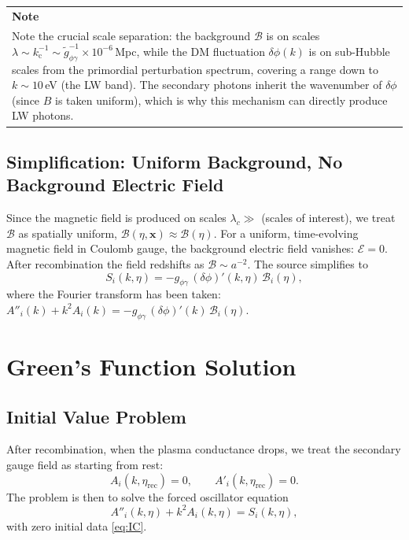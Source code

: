 \documentclass[12pt,a4paper]{report}
\newenvironment{notebox}[1][Note]{%
  \par\medskip\noindent
  \begin{tabular}{|p{\dimexpr\linewidth-2\tabcolsep-2\arrayrulewidth\relax}|}
  \hline
  \textbf{#1}\\[2pt]
}{%
  \\ \hline
  \end{tabular}
  \par\medskip
}
\newcommand{\kc}{k_{\mathrm{c}}}
\newcommand{\gag}{g_{\phi\gamma}}
\newcommand{\gtag}{\tilde{g}_{\phi\gamma}}
\renewcommand{\vec}[1]{\boldsymbol{#1}}
\theoremstyle{definition}
\begin{document}
\begin{notebox}
Note the crucial scale separation: the background $\mathcal{B}$ is on scales
$\lambda\sim\kc^{-1}\sim\gtag^{-1}\times 10^{-6}$\,Mpc, while the DM fluctuation
$\delta\phi(k)$ is on sub-Hubble scales from the primordial perturbation spectrum,
covering a range down to $k\sim 10$\,eV (the LW band). The secondary photons inherit
the wavenumber of $\delta\phi$ (since $B$ is taken uniform), which is why this
mechanism can directly produce LW photons.
\end{notebox}

\section{Simplification: Uniform Background, No Background Electric Field}

Since the magnetic field is produced on scales $\lambda_c\gg$ (scales of interest),
we treat $\mathcal{B}$ as spatially uniform, $\mathcal{B}(\eta,\vec{x})\approx\mathcal{B}(\eta)$.
For a uniform, time-evolving magnetic field in Coulomb gauge, the background electric
field vanishes: $\mathcal{E}=0$. After recombination the field redshifts as
$\mathcal{B}\sim a^{-2}$. The source simplifies to
\begin{equation}
  S_i(k,\eta) = -\gag\,(\delta\phi)'(k,\eta)\,\mathcal{B}_i(\eta),
  \label{eq:source_simple}
\end{equation}
where the Fourier transform has been taken:
$A''_i(k) + k^2 A_i(k) = -\gag\,(\delta\phi)'(k)\,\mathcal{B}_i(\eta)$.

\chapter{Green's Function Solution}

\section{Initial Value Problem}

After recombination, when the plasma conductance drops, we treat the secondary gauge
field as starting from rest:
\begin{equation}
  A_i(k,\eta_{\mathrm{rec}}) = 0,
  \qquad
  A'_i(k,\eta_{\mathrm{rec}}) = 0.
  \label{eq:IC}
\end{equation}
The problem is then to solve the forced oscillator equation
\begin{equation}
  A''_i(k,\eta) + k^2 A_i(k,\eta) = S_i(k,\eta),
  \label{eq:forced}
\end{equation}
with zero initial data \eqref{eq:IC}.
\end{document}
